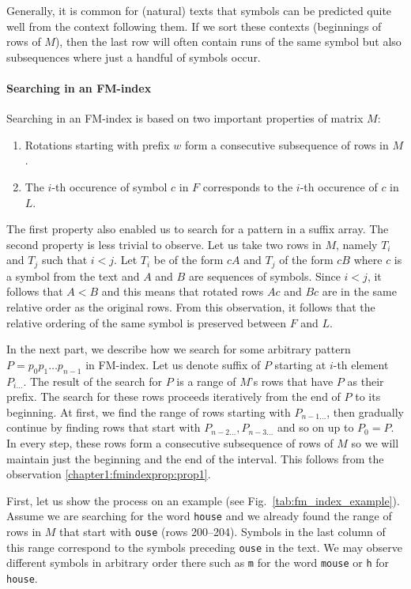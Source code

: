 Generally, it is common for (natural) texts that symbols can be predicted quite well from the context
following them. If we sort these contexts (beginnings of rows of $M$), then the last row will often
contain runs of the same symbol but also subsequences where just a handful of symbols occur.

\paragraph{Searching in an FM-index}

Searching in an FM-index is based on two important properties of matrix $M$:

\begin{enumerate}
	\item Rotations starting with prefix $w$ form a consecutive subsequence of rows in $M$.
	\label{chapter1:fmindexprop:prop1}
	\item The $i$-th occurence of symbol $c$ in $F$ corresponds to the $i$-th occurence of $c$ in~$L$.
	\label{chapter1:fmindexprop:prop2}
\end{enumerate}

The first property also enabled us to search for a pattern in a suffix array. The second property
is less trivial to observe. Let us take two rows in $M$, namely $T_i$ and $T_j$ such that
$i<j$. Let $T_i$ be of the form $cA$ and $T_j$ of the form $cB$ where $c$ is a symbol from
the text and $A$ and $B$ are sequences of symbols. Since $i<j$, it follows that $A<B$ and
this means that rotated rows $Ac$ and $Bc$ are in the same relative order as the original rows.
From this observation, it follows that the relative ordering of the same symbol is preserved
between $F$ and $L$.

In the next part, we describe how we search for some arbitrary pattern $P=p_0p_1\ldots p_{n-1}$
in FM-index. Let us denote suffix of $P$ starting at $i$-th element $P_{i\ldots}$. The result of
the search for $P$ is a range of $M$’s rows that have $P$ as their prefix. The search for these
rows proceeds iteratively from the end of $P$ to its beginning. At first, we find the range of
rows starting with  $P_{n-1\ldots}$, then gradually continue by finding rows that start with
$P_{n-2\ldots}, P_{n-3\ldots}$ and so on up to $P_0=P$. In every step, these rows form a
consecutive subsequence of rows of $M$ so we will maintain just the beginning and the end of
the interval. This follows from the observation \ref{chapter1:fmindexprop:prop1}.

First, let us show the process on an example (see Fig.~\ref{tab:fm_index_example}). Assume we are
searching for the word {\tt house} and we already found the range of rows in $M$ that start with
{\tt ouse} (rows 200--204). Symbols in the last column of this range correspond to the symbols
preceding {\tt ouse} in the text. We may observe different symbols in arbitrary order there such as
{\tt m} for the word {\tt mouse} or {\tt h} for {\tt house}.

